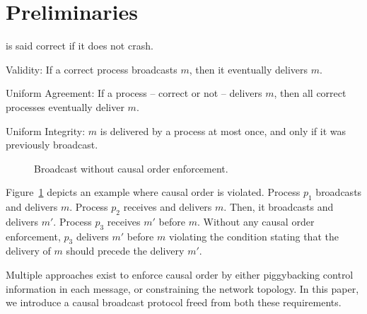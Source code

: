 
\section{Preliminaries}
\label{sec:preliminaries}

\begin{definition}[Process]
  is said correct if it does not crash.
\end{definition}

\begin{definition}[Broadcast]
  
\end{definition}

\begin{definition}

\begin{asparadesc}
\item [Validity:] If a correct process broadcasts $m$, then it eventually delivers $m$.
\item [Uniform Agreement:] If a process -- correct or not -- delivers $m$, then
  all correct processes eventually deliver $m$.
\item [Uniform Integrity:] $m$ is delivered by a process at most once, and only
  if it was previously broadcast.
\end{asparadesc}

\end{definition}


\begin{definition}
  
\end{definition}

\begin{figure}
  \begin{center}
  
  \caption{\label{fig:generalproblem}Broadcast without causal order
    enforcement.}
  \end{center}
\end{figure}

Figure~\ref{fig:generalproblem} depicts an example where causal order is
violated. Process $p_1$ broadcasts and delivers $m$. Process $p_2$ receives and
delivers $m$. Then, it broadcasts and delivers $m'$. Process $p_3$ receives $m'$
before $m$. Without any causal order enforcement, $p_3$ delivers $m'$ before $m$
violating the condition stating that the delivery of $m$ should precede the
delivery $m'$.

Multiple approaches exist to enforce causal order by either piggybacking control
information in each message, or constraining the network topology. In this
paper, we introduce a causal broadcast protocol freed from both these
requirements.


